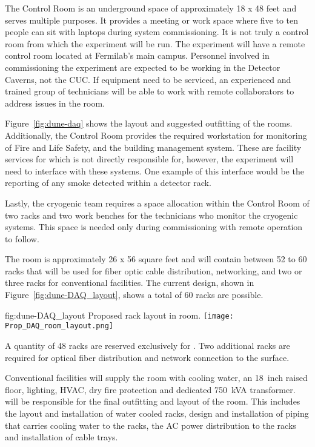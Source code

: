The Control Room is an underground space of approximately 18 x 48 feet
and serves multiple purposes.  It provides a meeting or work space
where five to ten people can sit with laptops during system
commissioning.  It is not truly a control room from which the
experiment will be run.  The  experiment will have a remote
control room located at Fermilab's main campus.  Personnel involved in
commissioning the experiment are expected to be working in the
Detector Caverns, not the CUC.  If  equipment need to be serviced,
an experienced and trained group of technicians will be able to work
with remote collaborators to address issues in the  room.

Figure~\ref{fig:dune-daq} shows the layout and suggested outfitting of
the rooms. Additionally, the Control Room provides the required
workstation for monitoring of Fire and Life Safety, and the building
management system.  These are facility services for which  is not
directly responsible for, however, the experiment will need to
interface with these systems.  One example of this interface would be
the reporting of any smoke detected within a detector rack.

Lastly, the cryogenic team requires a space allocation within the
Control Room of two racks and two work benches for the technicians who
monitor the cryogenic systems.  This space is needed only during
commissioning with remote operation to follow.
       
The  room is approximately 26 x 56 square feet and will
contain between 52 to 60 racks that will be used for fiber optic cable
distribution, networking,   and two or three
racks for conventional facilities.  The current design, shown in
Figure~\ref{fig:dune-DAQ_layout}, shows a total of 60 racks are
possible.
\begin{dunefigure}{fig:dune-DAQ_layout}
  {Proposed rack layout in  room.}
  \texttt{[image: Prop\_DAQ\_room\_layout.png]}
\end{dunefigure}
  

A quantity of 48 racks are reserved exclusively for .  Two
additional racks are required for optical fiber distribution and
network connection to the surface.

Conventional facilities will supply the  room with cooling
water, an 18~inch raised floor, lighting, HVAC, dry fire protection
and dedicated 750~kVA transformer.   will be responsible for
the final outfitting and layout of the room.  This includes the layout
and installation of water cooled racks, design and installation of
piping that carries cooling water to the racks, the AC power
distribution to the racks and installation of cable trays.

